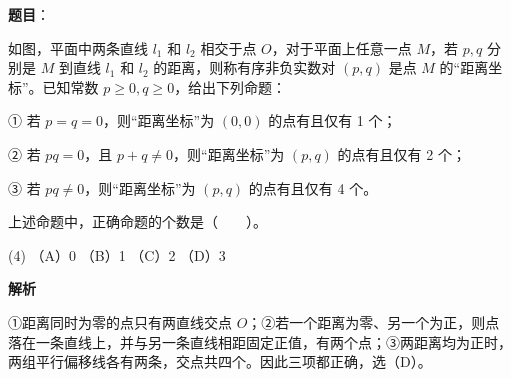 \begin{answer}

\textbf{题目}：

如图，平面中两条直线 $l_1$ 和 $l_2$ 相交于点 $O$，对于平面上任意一点 $M$，若 $p,q$ 分别是 $M$ 到直线 $l_1$ 和 $l_2$ 的距离，则称有序非负实数对 $(p,q)$ 是点 $M$ 的“距离坐标”。已知常数 $p\ge0,q\ge0$，给出下列命题：

① 若 $p=q=0$，则“距离坐标”为 $(0,0)$ 的点有且仅有 1 个；

② 若 $pq=0$，且 $p+q\ne0$，则“距离坐标”为 $(p,q)$ 的点有且仅有 2 个；

③ 若 $pq\ne0$，则“距离坐标”为 $(p,q)$ 的点有且仅有 4 个。

上述命题中，正确命题的个数是\mbox{（　　）}。

\begin{gkopts}(4)
\task （A）0
\task （B）1
\task （C）2
\task （D）3
\end{gkopts}
\nopagebreak[4]
\begin{center}\end{center}
\nopagebreak[4]
\textbf{解析}

①距离同时为零的点只有两直线交点 $O$；②若一个距离为零、另一个为正，则点落在一条直线上，并与另一条直线相距固定正值，有两个点；③两距离均为正时，两组平行偏移线各有两条，交点共四个。因此三项都正确，选（D）。


\end{answer}


